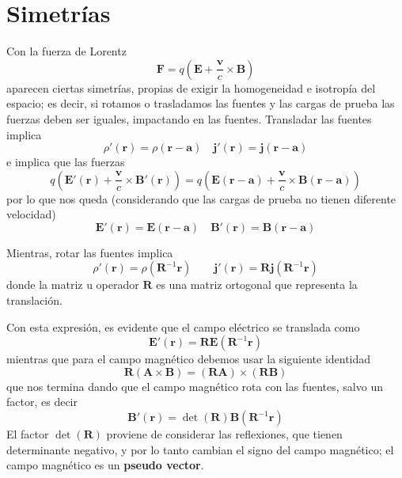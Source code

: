 \documentclass[a4paper]{article}
\numberwithin{equation}{section} %
\renewcommand{\vec}[1]{\boldsymbol{#1}}
\begin{document}
\section{Simetrías}
Con la fuerza de Lorentz
\begin{equation}
\vec{F} = q \left(\vec{E} + \frac{\vec{v}}{c} \times \vec{B}\right)
\end{equation}
aparecen ciertas simetrías, propias de exigir la homogeneidad e isotropía del espacio; es decir, si rotamos o trasladamos las fuentes y las cargas de prueba las fuerzas deben ser iguales, impactando en las fuentes.
Transladar las fuentes implica
\begin{equation}
\rho'(\vec{r}) = \rho(\vec{r} - \vec{a}) \quad \vec{j}'(\vec{r}) = \vec{j}(\vec{r} - \vec{a})
\end{equation}
e implica que las fuerzas
\[q \left(\vec{E}'(\vec{r}) + \frac{\vec{v}}{c} \times \vec{B}'(\vec{r})\right) = q \left(\vec{E}(\vec{r} - \vec{a}) + \frac{\vec{v}}{c} \times \vec{B}(\vec{r} - \vec{a})\right)\]
por lo que nos queda (considerando que las cargas de prueba no tienen diferente velocidad)
\begin{equation}
\vec{E}'(\vec{r}) = \vec{E}(\vec{r} - \vec{a}) \quad \vec{B}'(\vec{r}) = \vec{B}(\vec{r} - \vec{a})
\end{equation}

Mientras, rotar las fuentes implica
\begin{equation}
\rho'(\vec{r}) = \rho(\vec{R}^{-1} \vec{r}) \qquad \vec{j}'(\vec{r}) = \vec{R}\vec{j}(\vec{R}^{-1} \vec{r})
\end{equation}
donde la matriz u operador $\vec{R}$ es una matriz ortogonal que representa la translación.

Con esta expresión, es evidente que el campo eléctrico se translada como
\begin{equation}
\vec{E}'(\vec{r}) = \vec{R} \vec{E}(\vec{R}^{-1} \vec{r})
\end{equation}
mientras que para el campo magnético debemos usar la siguiente identidad
\begin{equation}
\vec{R} (\vec{A} \times \vec{B}) = (\vec{R} \vec{A}) \times (\vec{R} \vec{B})
\end{equation}
que nos termina dando que el campo magnético rota con las fuentes, salvo un factor, es decir
\begin{equation}
\vec{B}'(\vec{r}) = \det(\vec{R}) \vec{B}(\vec{R}^{-1} \vec{r})
\end{equation}
El factor $\det(\vec{R})$ proviene de considerar las reflexiones, que tienen determinante negativo, y por lo tanto cambian el signo del campo magnético; el campo magnético es un \textbf{pseudo vector}.
\end{document}
